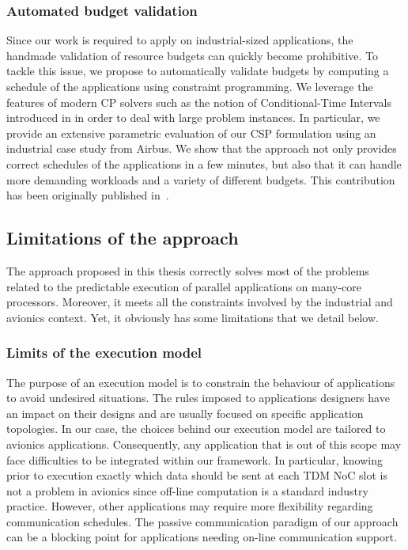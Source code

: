 \documentclass[main.tex]{subfiles}
\begin{document}
\subsubsection{Automated budget validation}
Since our work is required to apply on industrial-sized applications, the handmade validation of resource budgets can quickly become prohibitive. To tackle this issue, we propose to automatically validate budgets by computing a schedule of the applications using constraint programming. We leverage the features of modern CP solvers such as the notion of Conditional-Time Intervals introduced in \CPOpti in order to deal with large problem instances. In particular, we provide an extensive parametric evaluation of our CSP formulation using an industrial case study from Airbus. We show that the approach not only provides correct schedules of the applications in a few minutes, but also that it can handle more demanding workloads and a variety of different budgets. This contribution has been originally published in~\cite{Perret16_RTNS}.

\subsection{Limitations of the approach}
The approach proposed in this thesis correctly solves most of the problems related to the predictable execution of parallel applications on many-core processors. Moreover, it meets all the constraints involved by the industrial and avionics context. Yet, it obviously has some limitations that we detail below.

\subsubsection{Limits of the execution model}
The purpose of an execution model is to constrain the behaviour of applications to avoid undesired situations. The rules imposed to applications designers have an impact on their designs and are usually focused on specific application topologies. In our case, the choices behind our execution model are tailored to avionics applications. Consequently, any application that is out of this scope may face difficulties to be integrated within our framework. In particular, knowing prior to execution exactly which data should be sent at each TDM NoC slot is not a problem in avionics since off-line computation is a standard industry practice. However, other applications may require more flexibility regarding communication schedules. The passive communication paradigm of our approach can be a blocking point for applications needing on-line communication support.
\end{document}
